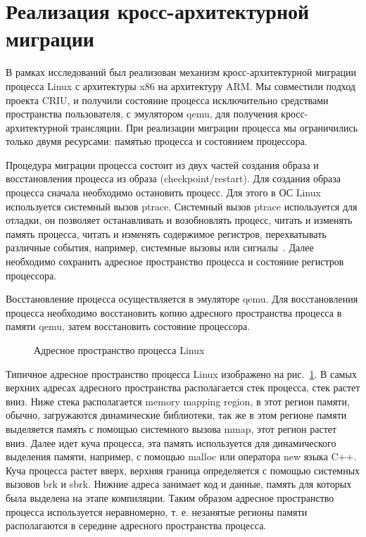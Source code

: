 \section{Реализация кросс-архитектурной миграции}

В рамках исследований был реализован механизм кросс-архитектурной миграции процесса Linux с архитектуры x86 на архитектуру ARM. Мы совместили подход проекта CRIU, и получили состояние процесса исключительно средствами пространства пользователя, с эмулятором qemu, для получения кросс-архитектурной трансляции. При реализации миграции процесса мы ограничились только двумя ресурсами: памятью процесса и состоянием процессора.

Процедура миграции процесса состоит из двух частей создания образа и восстановления процесса из образа (checkpoint/restart). Для создания образа процесса сначала необходимо остановить процесс. Для этого в ОС Linux используется системный вызов ptrace. Системный вызов ptrace используется для отладки, он позволяет останавливать и возобновлять процесс, читать и изменять память процесса, читать и изменять содержимое регистров, перехватывать различные события, например, системные вызовы или сигналы~\cite{PTRACEP1,PTRACEP2}. Далее необходимо сохранить адресное пространство процесса и состояние регистров процессора.

Восстановление процесса осуществляется в эмуляторе qemu. Для восстановления процесса необходимо восстановить копию адресного пространства процесса в памяти qemu, затем восстановить состояние процессора.

\begin{figure}[h]
  \caption{Адресное пространство процесса Linux}
  \label{img:memmap}
\end{figure}

Типичное адресное пространство процесса Linux изображено на рис.~\ref{img:memmap}. В самых верхних адресах адресного пространства располагается стек процесса, стек растет вниз. Ниже стека располагается memory mapping region, в этот регион памяти, обычно, загружаются динамические библиотеки, так же в этом регионе памяти выделяется память с помощью системного вызова mmap, этот регион растет вниз. Далее идет куча процесса, эта память используется для динамического выделения памяти, например, с помощью malloc или оператора new языка C++. Куча процесса растет вверх, верхняя граница определяется с помощью системных вызовов brk и sbrk. Нижние адреса занимает код и данные, память для которых была выделена на этапе компиляции. Таким образом адресное пространство процесса используется неравномерно, т. е. незанятые регионы памяти располагаются в середине адресного пространства процесса.

